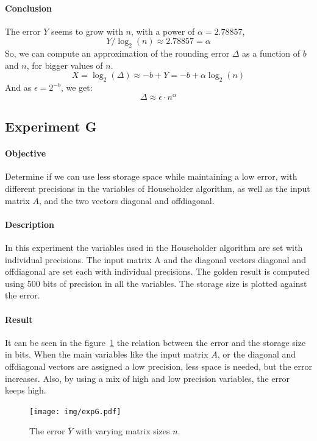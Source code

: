 \documentclass[11pt,a4paper]{article}
\begin{document}
\paragraph{Conclusion}
The error $Y$ seems to grow with $n$, with a power of $\alpha = 2.78857$,
%
$$Y/\log_2(n) \approx 2.78857 = \alpha $$
%
So, we can compute an approximation of the rounding error $\Delta$ as a function 
of $b$ and $n$, for bigger values of $n$.
%
$$ X = \log_2(\Delta) \approx -b + Y = -b + \alpha \log_2(n) $$
%
And as $\epsilon = 2^{-b}$, we get:
%
$$ \Delta \approx \epsilon \cdot n^\alpha $$


\newpage
\subsection*{Experiment G}

\paragraph{Objective}
Determine if we can use less storage space while maintaining a low error, with 
different precisions in the variables of Householder algorithm, as well as the 
input matrix $A$, and the two vectors diagonal and offdiagonal.  

\paragraph{Description}
In this experiment the variables used in the Householder algorithm are set with 
individual precisions. The input matrix A and the diagonal vectors diagonal and 
offdiagonal are set each with individual precisions.
The golden result is computed using 500 bits of precision in all the variables.  
The storage size is plotted against the error.

\paragraph{Result}
It can be seen in the figure~\ref{fig:expG} the relation between the error and 
the storage size in bits. When the main variables like the input matrix $A$, or 
the diagonal and offdiagonal vectors are assigned a low precision, less space is 
needed, but the error increases. Also, by using a mix of high and low precision 
variables, the error keeps high.

\begin{figure}[h]
	\centering
	\texttt{[image: img/expG.pdf]}
	\caption{The error $\overline Y$ with varying matrix sizes $n$.}
	\label{fig:expG}
\end{figure}
\end{document}
